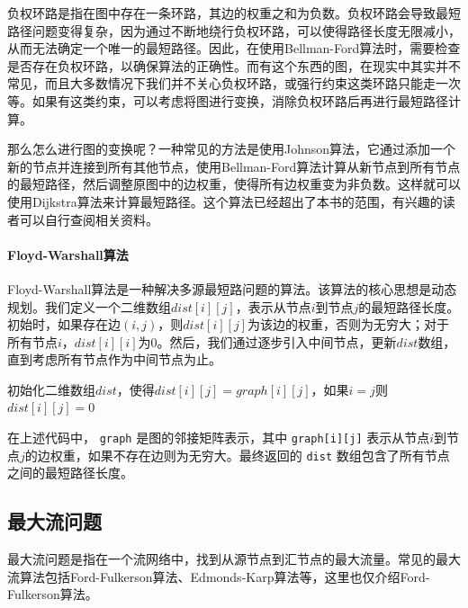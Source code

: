 负权环路是指在图中存在一条环路，其边的权重之和为负数。负权环路会导致最短路径问题变得复杂，因为通过不断地绕行负权环路，可以使得路径长度无限减小，从而无法确定一个唯一的最短路径。因此，在使用Bellman-Ford算法时，需要检查是否存在负权环路，以确保算法的正确性。而有这个东西的图，在现实中其实并不常见，而且大多数情况下我们并不关心负权环路，或强行约束这类环路只能走一次等。如果有这类约束，可以考虑将图进行变换，消除负权环路后再进行最短路径计算。

那么怎么进行图的变换呢？一种常见的方法是使用Johnson算法，它通过添加一个新的节点并连接到所有其他节点，使用Bellman-Ford算法计算从新节点到所有节点的最短路径，然后调整原图中的边权重，使得所有边权重变为非负数。这样就可以使用Dijkstra算法来计算最短路径。这个算法已经超出了本书的范围，有兴趣的读者可以自行查阅相关资料。

\paragraph{Floyd-Warshall算法} Floyd-Warshall算法是一种解决多源最短路问题的算法。该算法的核心思想是动态规划。我们定义一个二维数组$dist[i][j]$，表示从节点$i$到节点$j$的最短路径长度。初始时，如果存在边$(i, j)$，则$dist[i][j]$为该边的权重，否则为无穷大；对于所有节点$i$，$dist[i][i]$为0。然后，我们通过逐步引入中间节点，更新$dist$数组，直到考虑所有节点作为中间节点为止。

\begin{algorithm}[htbp]
    \caption{Floyd-Warshall算法}
    初始化二维数组$dist$，使得$dist[i][j] = graph[i][j]$，如果$i = j$则$dist[i][j] = 0$\;
    \;
\end{algorithm}

在上述代码中， \texttt{graph} 是图的邻接矩阵表示，其中 \texttt{graph[i][j]} 表示从节点$i$到节点$j$的边权重，如果不存在边则为无穷大。最终返回的 \texttt{dist} 数组包含了所有节点之间的最短路径长度。

\subsection{最大流问题}

最大流问题是指在一个流网络中，找到从源节点到汇节点的最大流量。常见的最大流算法包括Ford-Fulkerson算法、Edmonds-Karp算法等，这里也仅介绍Ford-Fulkerson算法。

